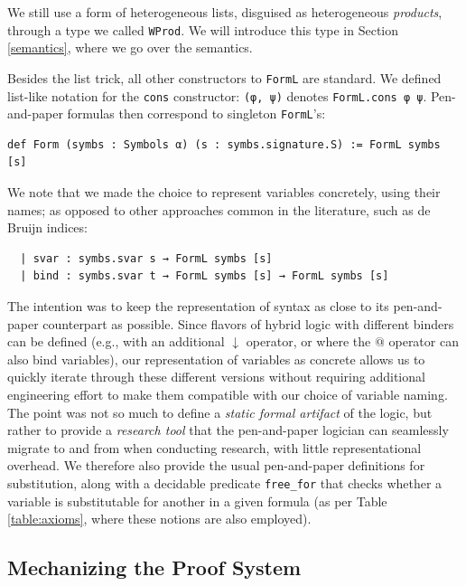 \documentclass{easychair}
\theoremstyle{remark}
\begin{document}
We still use a form of heterogeneous lists, disguised as heterogeneous \textit{products}, through a type we called \lstinline{WProd}. We will introduce this type in Section \ref{semantics}, where we go over the semantics.

Besides the list trick, all other constructors to \lstinline{FormL} are standard. We defined list-like notation for the \lstinline{cons} constructor: \lstinline{(φ, ψ)} denotes \lstinline{FormL.cons φ ψ}. Pen-and-paper formulas then correspond to singleton \lstinline{FormL}'s:

\begin{lstlisting}
def Form (symbs : Symbols α) (s : symbs.signature.S) := FormL symbs [s]
\end{lstlisting}

We note that we made the choice to represent variables concretely, using their names; as opposed to other approaches common in the literature, such as de Bruijn indices:

\begin{lstlisting}
  | svar : symbs.svar s → FormL symbs [s]
  | bind : symbs.svar t → FormL symbs [s] → FormL symbs [s]
\end{lstlisting}

The intention was to keep the representation of syntax as close to its pen-and-paper counterpart as possible. Since flavors of hybrid logic with different binders can be defined (e.g., with an additional $\downarrow$ operator, or where the $@$ operator can also bind variables), our representation of variables as concrete allows us to quickly iterate through these different versions without requiring additional engineering effort to make them compatible with our choice of variable naming. The point was not so much to define a \textit{static formal artifact} of the logic, but rather to provide a \textit{research tool} that the pen-and-paper logician can seamlessly migrate to and from when conducting research, with little representational overhead. We therefore also provide the usual pen-and-paper definitions for substitution, along with a decidable predicate \lstinline{free_for} that checks whether a variable is substitutable for another in a given formula (as per Table \ref{table:axioms}, where these notions are also employed).

\subsection{Mechanizing the Proof System}\label{proofsys}
\end{document}
